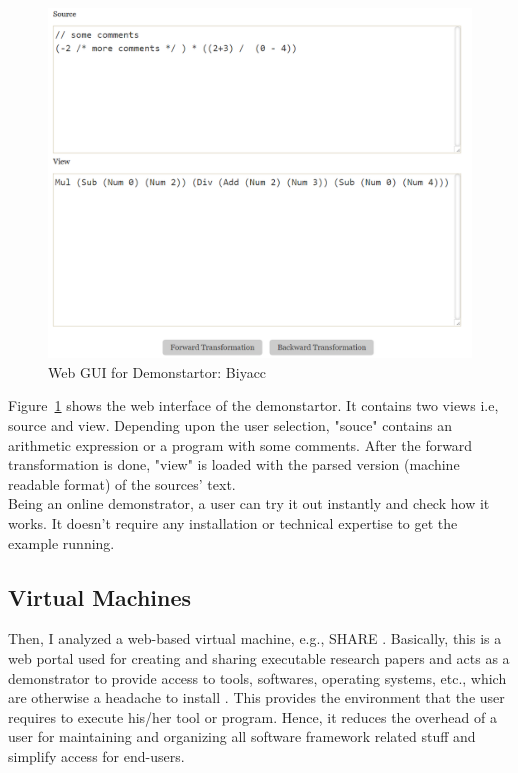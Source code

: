 \begin{figure}
	\includegraphics[width=1\textwidth]{figures/Biyacc}
	\caption{Web GUI for Demonstartor: Biyacc}
	\label{fig:WebGUI_Biyacc}
\end{figure}

Figure~\ref{fig:WebGUI_Biyacc} shows the web interface of the demonstartor. It contains two views i.e, source and view. Depending upon the user selection, "souce" contains an arithmetic expression or a program with some comments. After the forward transformation is done, "view" is loaded with the parsed version (machine readable format) of the sources' text.\\  
Being an online demonstrator, a user can try it out instantly and check how it works. It doesn't require any installation or technical expertise to get the example running.

\subsection{Virtual Machines}\label{subsec:virtualmachines}
Then, I analyzed a web-based virtual machine, e.g., SHARE \cite{share}. Basically, this is a web portal used for creating and sharing executable research papers and acts as a demonstrator to provide access to tools, softwares, operating systems, etc., which are otherwise a headache to install \cite{share}. 
\newline\newline This provides the environment that the user requires to execute his/her tool or program. Hence, it reduces the overhead of a user for maintaining and organizing all software framework related stuff and simplify access for end-users.

